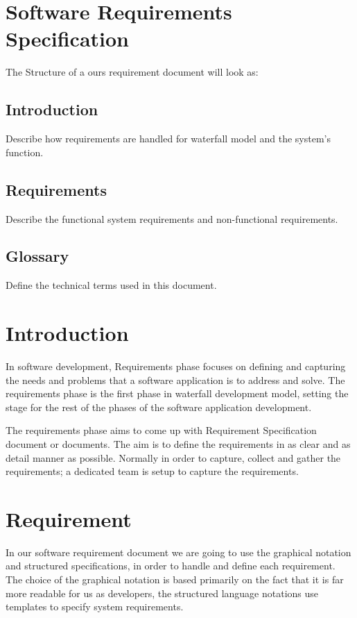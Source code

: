 \section*{Software Requirements Specification}

The Structure of a ours requirement document will look as:

\subsection*{Introduction}
Describe how requirements are handled for waterfall model and the system’s function.

\subsection*{Requirements}
Describe the functional system requirements and non-functional requirements.

\subsection*{Glossary}
Define the technical terms used in this document. 

\section*{Introduction}
In software development, Requirements phase focuses on defining and capturing the needs and problems that a software application is to address and solve. The requirements phase is the first phase in waterfall development model, setting the stage for the rest of the phases of the software application development. 


The requirements phase aims to come up with Requirement Specification document or documents. The aim is to define the requirements in as clear and as detail manner as possible. Normally in order to capture, collect and gather the requirements; a dedicated team is setup to capture the requirements. 


\section*{Requirement}
In our software requirement document we are going to use the graphical notation and structured specifications, in order to handle and define each requirement. The choice of the graphical notation is based primarily on the fact that it is far more readable for us as developers, the structured language notations use templates to specify system
requirements.


